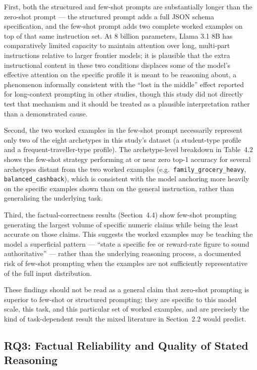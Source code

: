 First, both the structured and few-shot prompts are substantially longer than the zero-shot prompt --- the structured prompt adds a full JSON schema specification, and the few-shot prompt adds two complete worked examples on top of that same instruction set. At 8 billion parameters, Llama 3.1 8B has comparatively limited capacity to maintain attention over long, multi-part instructions relative to larger frontier models; it is plausible that the extra instructional content in these two conditions displaces some of the model's effective attention on the specific profile it is meant to be reasoning about, a phenomenon informally consistent with the ``lost in the middle'' effect reported for long-context prompting in other studies, though this study did not directly test that mechanism and it should be treated as a plausible interpretation rather than a demonstrated cause.

Second, the two worked examples in the few-shot prompt necessarily represent only two of the eight archetypes in this study's dataset (a student-type profile and a frequent-traveller-type profile). The archetype-level breakdown in Table~4.2 shows the few-shot strategy performing at or near zero top-1 accuracy for several archetypes distant from the two worked examples (e.g.\ \texttt{family\_grocery\_heavy}, \texttt{balanced\_cashback}), which is consistent with the model anchoring more heavily on the specific examples shown than on the general instruction, rather than generalising the underlying task.

Third, the factual-correctness results (Section~4.4) show few-shot prompting generating the largest volume of specific numeric claims while being the least accurate on those claims. This suggests the worked examples may be teaching the model a superficial pattern --- ``state a specific fee or reward-rate figure to sound authoritative'' --- rather than the underlying reasoning process, a documented risk of few-shot prompting when the examples are not sufficiently representative of the full input distribution.

These findings should not be read as a general claim that zero-shot prompting is superior to few-shot or structured prompting; they are specific to this model scale, this task, and this particular set of worked examples, and are precisely the kind of task-dependent result the mixed literature in Section~2.2 would predict.

\subsection{RQ3: Factual Reliability and Quality of Stated Reasoning}

